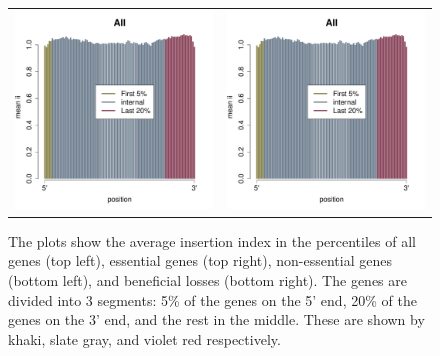 \documentclass[12pt,letterpaper]{article}
\begin{document}
\begin{figure}
\begin{tabular}{c c}
\includegraphics[scale=0.4, page=3]{insertion-position-bias.pdf}&
\includegraphics[scale=0.4, page=4]{insertion-position-bias.pdf}
\end{tabular}
\caption{The plots show the average insertion index in the percentiles of all genes (top left), essential genes (top right), non-essential genes (bottom left), and beneficial losses (bottom right). The genes are divided into 3 segments: 5\% of
the genes on the 5' end, 20\% of the genes on the 3' end, and the rest in the middle. These are shown by khaki, slate gray, and violet red respectively.}
\label{fig:insertion-position-bias}
\end{figure}
\end{document}
